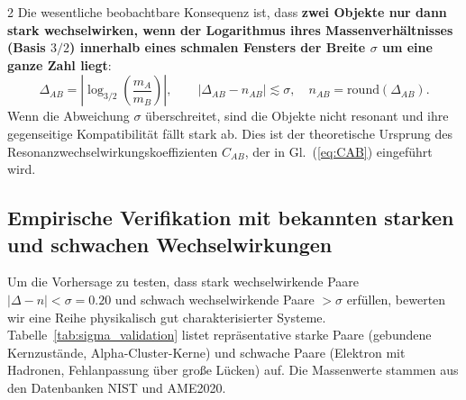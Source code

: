\documentclass[11pt,a4paper]{article}
\begin{document}
\begin{multicols}{2}
		Die wesentliche beobachtbare Konsequenz ist, dass \textbf{zwei Objekte nur dann stark wechselwirken, wenn der Logarithmus ihres Massenverhältnisses (Basis \(3/2\)) innerhalb eines schmalen Fensters der Breite $\sigma$ um eine ganze Zahl liegt}:
		\[
		\Delta_{AB} = \left| \log_{3/2}\left( \frac{m_A}{m_B} \right) \right|,\qquad
		|\Delta_{AB} - n_{AB}| \lesssim \sigma,\quad n_{AB} = \text{round}(\Delta_{AB}).
		\]
		Wenn die Abweichung $\sigma$ überschreitet, sind die Objekte nicht resonant und ihre gegenseitige Kompatibilität fällt stark ab. Dies ist der theoretische Ursprung des Resonanzwechselwirkungskoeffizienten \(C_{AB}\), der in Gl.~(\ref{eq:CAB}) eingeführt wird.
		
		\subsection{Empirische Verifikation mit bekannten starken und schwachen Wechselwirkungen}
		
		Um die Vorhersage zu testen, dass stark wechselwirkende Paare \(|\Delta - n| < \sigma = 0.20\) und schwach wechselwirkende Paare \(> \sigma\) erfüllen, bewerten wir eine Reihe physikalisch gut charakterisierter Systeme. Tabelle~\ref{tab:sigma_validation} listet repräsentative starke Paare (gebundene Kernzustände, Alpha-Cluster-Kerne) und schwache Paare (Elektron mit Hadronen, Fehlanpassung über große Lücken) auf. Die Massenwerte stammen aus den Datenbanken NIST und AME2020.
		

\end{multicols}
\end{document}
